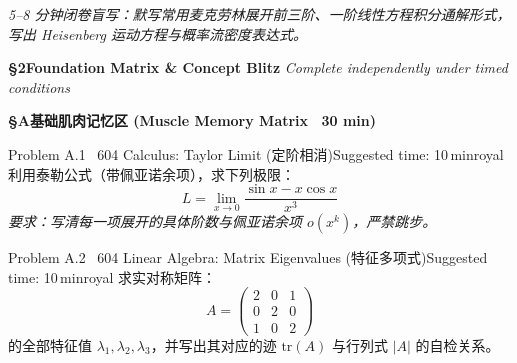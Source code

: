 \documentclass[a4paper,11pt]{article}
\begin{document}
\vspace{4pt}

\begin{tcolorbox}[
  enhanced, colback=white, colframe=border, boxrule=0.6pt, arc=2mm,
  left=4mm, right=4mm, top=3mm, bottom=3mm,
  fonttitle=\sffamily\bfseries\color{slate},
  title={\raisebox{0pt}{\color{royal}\rule{3pt}{10pt}}\hspace{4pt}Warm-Up Retrieval Workspace \textbar\ 白纸破冰与间隔提取草稿区},
  colbacktitle=paper, coltitle=slate,
  titlerule=0pt, toptitle=2mm, bottomtitle=2mm
]
\textcolor{mist}{\footnotesize\itshape 5--8 分钟闭卷盲写：默写常用麦克劳林展开前三阶、一阶线性方程积分通解形式，写出 Heisenberg 运动方程与概率流密度表达式。}
\vspace{9.0cm}
\end{tcolorbox}

\clearpage

{\Large\sffamily\bfseries\color{navy} \S 2\quad Foundation Matrix \& Concept Blitz}
\hfill{\small\sffamily\color{mist}\itshape Complete independently under timed conditions}

\vspace{6pt}

{\normalsize\sffamily\bfseries\color{royal} \S A\quad 基础肌肉记忆区 (Muscle Memory Matrix \textperiodcentered\ 30 min)}
\vspace{2pt}

\begin{problembox}{Problem A.1 \textbar\ 604 Calculus: Taylor Limit (定阶相消)}{Suggested time: 10\,min}{royal}
利用泰勒公式（带佩亚诺余项），求下列极限：
\[
  L = \lim_{x \to 0} \frac{\sin x - x \cos x}{x^3}
\]
\textit{要求：写清每一项展开的具体阶数与佩亚诺余项 $o(x^k)$，严禁跳步。}
\end{problembox}

\vspace{3pt}

\begin{problembox}{Problem A.2 \textbar\ 604 Linear Algebra: Matrix Eigenvalues (特征多项式)}{Suggested time: 10\,min}{royal}
求实对称矩阵：
\[
  A = \begin{pmatrix} 2 & 0 & 1 \\ 0 & 2 & 0 \\ 1 & 0 & 2 \end{pmatrix}
\]
的全部特征值 $\lambda_1, \lambda_2, \lambda_3$，并写出其对应的迹 $\mathrm{tr}(A)$ 与行列式 $|A|$ 的自检关系。
\end{problembox}
\end{document}

